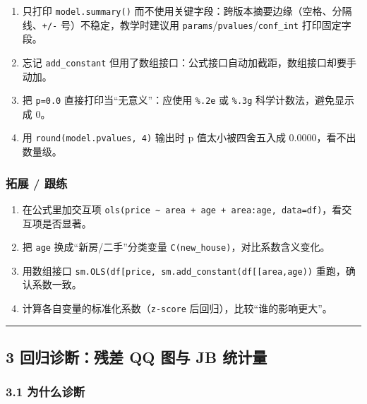 \begin{enumerate}
\def\labelenumi{\arabic{enumi}.}
\tightlist
\item
  只打印 \texttt{model.summary()}
  而不使用关键字段：跨版本摘要边缘（空格、分隔线、\texttt{+/-}
  号）不稳定，教学时建议用
  \texttt{params}/\texttt{pvalues}/\texttt{conf\_int} 打印固定字段。
\item
  忘记 \texttt{add\_constant}
  但用了数组接口：公式接口自动加截距，数组接口却要手动加。
\item
  把 \texttt{p=0.0} 直接打印当``无意义''：应使用 \texttt{\%.2e} 或
  \texttt{\%.3g} 科学计数法，避免显示成 0。
\item
  用 \texttt{round(model.pvalues,\ 4)} 输出时 p 值太小被四舍五入成
  0.0000，看不出数量级。
\end{enumerate}

\subsubsection{拓展 / 跟练}\label{ux62d3ux5c55-ux8ddfux7ec3-17}

\begin{enumerate}
\def\labelenumi{\arabic{enumi}.}
\tightlist
\item
  在公式里加交互项
  \texttt{ols(\textquotesingle{}price\ \textasciitilde{}\ area\ +\ age\ +\ area:age\textquotesingle{},\ data=df)}，看交互项是否显著。
\item
  把 \texttt{age} 换成``新房/二手''分类变量
  \texttt{C(new\_house)}，对比系数含义变化。
\item
  用数组接口
  \texttt{sm.OLS(df{[}\textquotesingle{}price\textquotesingle{}{]},\ sm.add\_constant(df{[}{[}\textquotesingle{}area\textquotesingle{},\textquotesingle{}age\textquotesingle{}{]}{]}))}
  重跑，确认系数一致。
\item
  计算各自变量的标准化系数（\texttt{z-score}
  后回归），比较``谁的影响更大''。
\end{enumerate}

\begin{center}\rule{0.5\linewidth}{0.5pt}\end{center}

\subsection{3 回归诊断：残差 QQ 图与 JB
统计量}\label{ux56deux5f52ux8bcaux65adux6b8bux5dee-qq-ux56feux4e0e-jb-ux7edfux8ba1ux91cf}

\subsubsection{3.1 为什么诊断}\label{ux4e3aux4ec0ux4e48ux8bcaux65ad}


